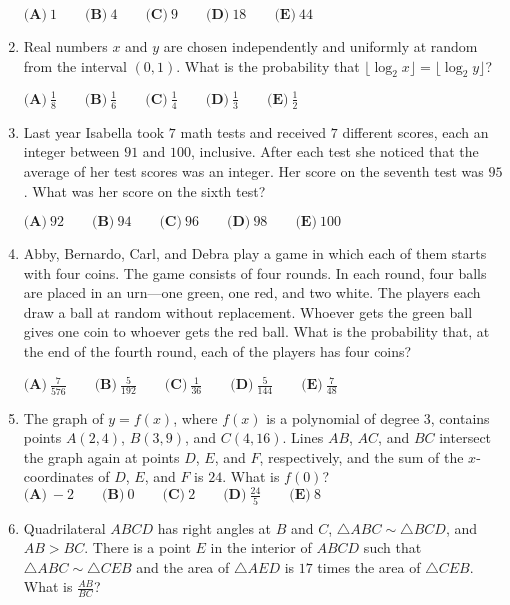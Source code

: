 \documentclass{article}
\begin{document}
\begin{enumerate}[label=\arabic*., itemsep=0.5em]
\(\textbf{(A)}\ 1\qquad\textbf{(B)}\ 4\qquad\textbf{(C)}\ 9\qquad\textbf{(D)}\ 18\qquad\textbf{(E)}\ 44\)\par \vspace{0.5em}\item Real numbers \(x\) and \(y\) are chosen independently and uniformly at random from the interval \((0,1)\). What is the probability that \(\lfloor\log_2x\rfloor=\lfloor\log_2y\rfloor\)?

\(\textbf{(A)}\ \frac{1}{8}\qquad\textbf{(B)}\ \frac{1}{6}\qquad\textbf{(C)}\ \frac{1}{4}\qquad\textbf{(D)}\ \frac{1}{3}\qquad\textbf{(E)}\ \frac{1}{2}\)\par \vspace{0.5em}\item Last year Isabella took \(7\) math tests and received \(7\) different scores, each an integer between \(91\) and \(100\), inclusive. After each test she noticed that the average of her test scores was an integer. Her score on the seventh test was \(95\). What was her score on the sixth test?

\(\textbf{(A)}\ 92\qquad\textbf{(B)}\ 94\qquad\textbf{(C)}\ 96\qquad\textbf{(D)}\ 98\qquad\textbf{(E)}\ 100\)\par \vspace{0.5em}\item Abby, Bernardo, Carl, and Debra play a game in which each of them starts with four coins. The game consists of four rounds. In each round, four balls are placed in an urn---one green, one red, and two white. The players each draw a ball at random without replacement. Whoever gets the green ball gives one coin to whoever gets the red ball. What is the probability that, at the end of the fourth round, each of the players has four coins?

\(\textbf{(A)}\ \frac{7}{576} \qquad \textbf{(B)}\ \frac{5}{192} \qquad \textbf{(C)}\ \frac{1}{36} \qquad \textbf{(D)}\ \frac{5}{144} \qquad\textbf{(E)}\ \frac{7}{48}\)\par \vspace{0.5em}\item The graph of \(y=f(x)\), where \(f(x)\) is a polynomial of degree \(3\), contains points \(A(2,4)\), \(B(3,9)\), and \(C(4,16)\). Lines \(AB\), \(AC\), and \(BC\) intersect the graph again at points \(D\), \(E\), and \(F\), respectively, and the sum of the \(x\)-coordinates of \(D\), \(E\), and \(F\) is \(24\). What is \(f(0)\)?
\(\textbf{(A)}\ -2 \qquad \textbf{(B)}\ 0 \qquad \textbf{(C)}\ 2 \qquad \textbf{(D)}\ \frac{24}{5} \qquad\textbf{(E)}\ 8\)\par \vspace{0.5em}\item Quadrilateral \(ABCD\) has right angles at \(B\) and \(C\), \(\triangle ABC \sim \triangle BCD\), and \(AB > BC\). There is a point \(E\) in the interior of \(ABCD\) such that \(\triangle ABC \sim \triangle CEB\) and the area of \(\triangle AED\) is \(17\) times the area of \(\triangle CEB\). What is \(\frac{AB}{BC}\)?


\end{enumerate}
\end{document}
